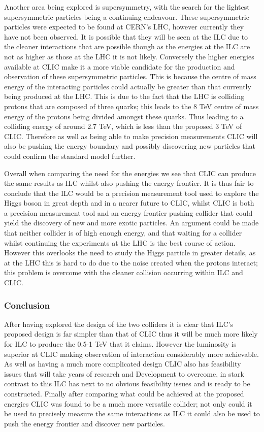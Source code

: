 Another area being explored is supersymmetry, with the search for the lightest supersymmetric particles being a continuing endeavour. These supersymmetric particles were expected to be found at CERN's LHC, however currently they have not been observed. It is possible that they will be seen at the ILC due to the cleaner interactions that are possible though as the energies at the ILC are not as higher as those at the LHC it is not likely. Conversely the higher energies available at CLIC make it a more viable candidate for the production and observation of these supersymmetric particles. This is because the centre of mass energy of the interacting particles could actually be greater than that currently being produced at the LHC. This is due to the fact that the LHC is colliding protons that are composed of three quarks; this leads to the 8 TeV centre of mass energy \cite{ATLAS:8TeV} of the protons being divided amongst these quarks. Thus leading to a colliding energy of around 2.7 TeV, which is less than the proposed 3 TeV of CLIC. Therefore as well as being able to make precision measurements CLIC will also be pushing the energy boundary and possibly discovering new particles that could confirm the standard model further.

Overall when comparing the need for the energies we see that CLIC can produce the same results as ILC whilst also pushing the energy frontier. It is thus fair to conclude that the ILC would be a precision measurement tool used to explore the Higgs boson in great depth and in a nearer future to CLIC, whilst CLIC is both a precision measurement tool and an energy frontier pushing collider that could yield the discovery of new and more exotic particles. An argument could be made that neither collider is of high enough energy, and that waiting for a collider whilst continuing the experiments at the LHC is the best course of action. However this overlooks the need to study the Higgs particle in greater details, as at the LHC this is hard to do due to the noise created when the protons interact; this problem is overcome with the cleaner collision occurring within ILC and CLIC.
	
\subsubsection{Conclusion}
After having explored the design of the two colliders it is clear that ILC's proposed design is far simpler than that of CLIC thus it will be much more likely for ILC to produce the 0.5-1 TeV that it claims. However the luminosity is superior at CLIC making observation of interaction considerably more achievable. As well as having a much more complicated design CLIC also has feasibility issues that will take years of research and Development to overcome, in stark contrast to this ILC has next to no obvious feasibility issues and is ready to be constructed. Finally after comparing what could be achieved at the proposed energies CLIC was found to be a much more versatile collider; not only could it be used to precisely measure the same interactions as ILC it could also be used to push the energy frontier and discover new particles.

